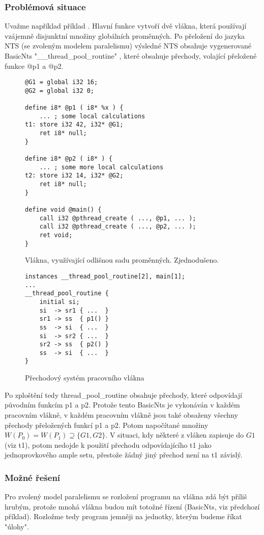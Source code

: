 \documentclass[10pt,a4paper,notitlepage]{report}
\begin{document}
\subsubsection{Problémová situace}
Uvažme například příklad . Hlavní funkce vytvoří dvě vlákna, která používají vzájemně disjunktní množiny globálních proměnných. Po přeložení do jazyka NTS (se zvoleným modelem paralelismu) výsledné NTS obsahuje vygenerované BasicNts "__thread_pool_routine" , které obsahuje přechody, volající přeložené funkce @p1 a @p2.
\begin{figure}[h!]
\begin{lstlisting}
@G1 = global i32 16;
@G2 = global i32 0;

define i8* @p1 ( i8* %x ) {
	... ; some local calculations
t1:	store i32 42, i32* @G1;
	ret i8* null;
}

define i8* @p2 ( i8* ) {
	... ; some more local calculations
t2:	store i32 14, i32* @G2;
	ret i8* null;
}

define void @main() {
	call i32 @pthread_create ( ..., @p1, ... );
	call i32 @pthread_create ( ..., @p2, ... );
	ret void;
}
\end{lstlisting}
\caption{Vlákna, využívající odlišnou sadu proměnných. Zjednodušeno.}
\end{figure}

\begin{figure}
\begin{lstlisting}
instances __thread_pool_routine[2], main[1];
...
__thread_pool_routine {
	initial	si;
	si  -> sr1 { ...  }
	sr1 -> ss  { p1() }
	ss  -> si  { ...  }
	si  -> sr2 { ...  }
	sr2 -> ss  { p2() }
	ss  -> si  { ...  }
}
\end{lstlisting}
\caption{Přechodový systém pracovního vlákna}
\end{figure}

Po zploštění tedy thread\_pool\_routine obsahuje přechody, které odpovídají původním funkcím p1 a p2. Protože tento BasicNts je vykonáván v každém pracovním vlákně, v každém pracovním vlákně jsou také obsaženy všechny přechody přeložených funkcí p1 a p2. Potom napočítané množiny $W(P_0) = W(P_1) \supseteq \{ G1, G2\}$. V situaci, kdy některé z vláken zapisuje do $G1$ (viz t1), potom nedojde k použití přechodu odpovídajícího t1 jako jednoprovkového ample setu, přestože žádný jiný přechod není na t1 závislý. 

\subsubsection{Možné řešení}
Pro zvolený model paralelismu se rozložení programu na vlákna zdá být příliš hrubým, protože mnohá vlákna budou mít totožné řízení (BasicNts, viz předchozí příklad). Rozložme tedy program jemněji na jednotky, kterým budeme říkat "úlohy".
\end{document}
